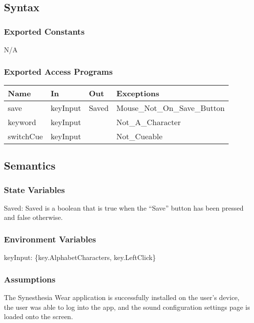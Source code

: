 \documentclass[12pt, titlepage]{article}
\begin{document}
\subsection{Syntax}

\subsubsection{Exported Constants}
N/A

\subsubsection{Exported Access Programs}

\begin{center}
\begin{tabular}{p{4cm} p{4cm} p{4cm} p{4cm}}
\hline
\textbf{Name} & \textbf{In} & \textbf{Out} & \textbf{Exceptions} \\
\hline
save & keyInput & Saved & Mouse\_Not\_On\_Save\_Button\\
\hline
keyword & keyInput &  & Not\_A\_Character \\
\hline
switchCue & keyInput &  & Not\_Cueable \\
\hline
\end{tabular}
\end{center}

\subsection{Semantics}

\subsubsection{State Variables}

Saved: Saved is a boolean that is true when the ``Save'' button has been pressed and false otherwise.

\subsubsection{Environment Variables}

keyInput: \{key.AlphabetCharacters, key.LeftClick\}

\subsubsection{Assumptions}

The Synesthesia Wear application is successfully installed on the user's device, the user was able to log into the app, 
and the sound configuration settings page is loaded onto the screen.
\end{document}
